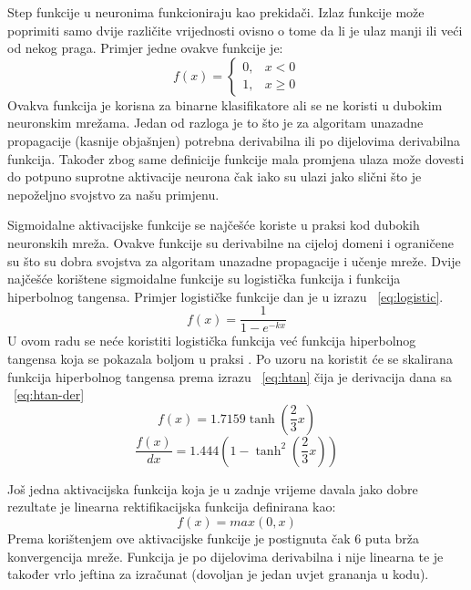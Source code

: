 \documentclass[times, utf8, zavrsni, numeric]{fer}
\begin{document}
Step funkcije u neuronima funkcioniraju kao prekidači. Izlaz funkcije može poprimiti samo dvije različite vrijednosti ovisno o tome da li je ulaz manji ili veći od nekog praga. Primjer jedne ovakve funkcije je:
\begin{equation}
  f(x) = \begin{cases}
    0, & \text{$x<0$}\\
    1, & \text{$x\geq0$}
  \end{cases}
\end{equation}
Ovakva funkcija je korisna za binarne klasifikatore ali se ne koristi u dubokim neuronskim mrežama. Jedan od razloga je to što je za algoritam unazadne propagacije (kasnije objašnjen) potrebna derivabilna ili po dijelovima derivabilna funkcija. Također zbog same definicije funkcije mala promjena ulaza može dovesti do potpuno suprotne aktivacije neurona čak iako su ulazi jako slični što je nepoželjno svojstvo za našu primjenu.

Sigmoidalne aktivacijske funkcije se najčešće koriste u praksi kod dubokih neuronskih mreža. Ovakve funkcije su derivabilne na cijeloj domeni i ograničene su što su dobra svojstva za algoritam unazadne propagacije i učenje mreže. Dvije najčešće korištene sigmoidalne funkcije su logistička funkcija i funkcija hiperbolnog tangensa. Primjer logističke funkcije dan je u izrazu ~\ref{eq:logistic}. 
\begin{equation}\label{eq:logistic}
f(x) = \frac{1}{1-e^{-kx}}
\end{equation}
U ovom radu se neće koristiti logistička funkcija već funkcija hiperbolnog tangensa koja se pokazala boljom u praksi \citep{lecun1998gradient}. Po uzoru na \citep{lecun1998gradient} koristit će se skalirana funkcija hiperbolnog tangensa prema izrazu ~\ref{eq:htan} čija je derivacija dana sa ~\ref{eq:htan-der}
\begin{equation}\label{eq:htan}
f(x) = 1.7159\tanh\left(\frac{2}{3}x\right)
\end{equation}
\begin{equation}\label{eq:htan-der}
\dfrac{f(x)}{dx} = 1.444\left(1-\tanh^2\left(\frac{2}{3}x\right)\right)
\end{equation}

Još jedna aktivacijska funkcija koja je u zadnje vrijeme davala jako dobre rezultate je linearna rektifikacijska funkcija definirana kao:
\begin{equation}\label{eq:relu}
f(x) = max(0, x)
\end{equation}
Prema \citep{krizhevsky2012imagenet} korištenjem ove aktivacijske funkcije je postignuta čak 6 puta brža konvergencija mreže. Funkcija je po dijelovima derivabilna i nije linearna te je također vrlo jeftina za izračunat (dovoljan je jedan uvjet grananja u kodu).
\end{document}
